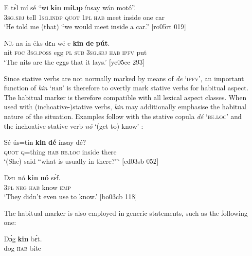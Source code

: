 \ea%
    \label{ex:key:342}
    \gll E    tɛ́l  mí    sé    “wi  \textbf{kin}  \textbf{mítɔp}  ínsay  wán  motó”.\\
\textsc{3sg.sbj}  tell  \textsc{1sg.indp}  \textsc{quot}    \phantom{“}\textsc{1pl}  \textsc{hab}  meet  inside  one  car\\


\glt ‘He told me (that) “we would meet inside a car.”   [ro05rt 019]
\z

\ea%
    \label{ex:key:343}
    \gll Nit  na  in    éks  dɛn  wé  e    \textbf{kin} \textbf{de} \textbf{pút}.\\
nit  \textsc{foc}  \textsc{3sg.poss}  egg  \textsc{pl}  \textsc{sub}  \textsc{3sg.sbj}  \textsc{hab}  \textsc{ipfv}  put\\

\glt ‘The nits are the eggs that it lays.’ [ye05ce 293]
\z

Since stative verbs are not normally marked by means of \textit{de} ‘\textsc{ipfv’}, an important function of \textit{kin} ‘\textsc{hab’} is therefore to overtly mark stative verbs for habitual aspect. The habitual marker is therefore compatible with all lexical aspect classes. When used with (inchoative-)stative verbs, \textit{kin} may additionally emphasise the habitual nature of the situation. Examples follow with the stative copula \textit{dé} \textsc{‘be.loc’}  and the inchoative-stative verb \textit{nó} ‘(get to) know’ :


\ea%
    \label{ex:key:344}
    \gll Sé    ús=tín  \textbf{kin} \textbf{dé}    ínsay  dé?\\
\textsc{quot}    \textsc{q}=thing  \textsc{hab}  \textsc{be.loc}  inside  there\\

\glt ‘(She) said “what is usually in there?”‘ [ed03sb 052]
\z


\ea%
    \label{ex:key:345}
    \gll Dɛn    nó  \textbf{kin}  \textbf{nó}    sɛ́f.\\
\textsc{3pl}    \textsc{neg}  \textsc{hab}  know  \textsc{emp}\\

\glt ‘They didn’t even use to know.’ [bo03cb 118]
\z

The habitual marker is also employed in generic statements, such as the following one:


\ea%
    \label{ex:key:346}
    \gll Dɔ́g    \textbf{kin}  bɛ́t.\\
dog    \textsc{hab}  bite\\

